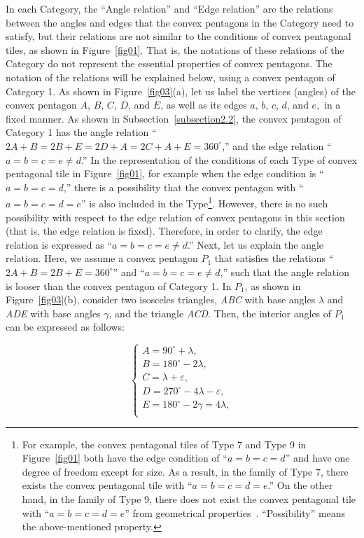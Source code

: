 \documentclass[11pt, a4paper]{article}
\begin{document}
In each Category, the ``Angle relation'' and ``Edge relation'' are the 
relations between the angles and edges that the convex pentagons in the 
Category need to satisfy, but their relations are not similar to the 
conditions of convex pentagonal tiles, as shown in Figure~\ref{fig01}. That is, the 
notations of these relations of the Category do not represent the essential 
properties of convex pentagons. The notation of the relations will be explained 
below, using a convex pentagon of Category 1. As shown in Figure~\ref{fig03}(a), 
let us label the vertices (angles) of the convex pentagon $A$, $B$, $C$, $D$, and 
$E$, as well as its edges $a$, $b$, $c$, $d$, and $e,$ in a fixed manner. As shown in 
Subsection~\ref{subsection2.2}, the convex pentagon of Category 1 has the angle 
relation ``$2A+B = 2B+E = 2D+A = 2C+A+E = 360^ \circ$,'' and the edge 
relation ``$a = b = c = e \ne d$.'' In the representation of the conditions of 
each Type of convex pentagonal tile in Figure~\ref{fig01}, for example 
when the edge condition is ``$a = b = c = d$,'' there is a possibility 
that the convex pentagon with ``$a = b = c = d = e$'' is also 
included in the Type\footnote{ For example, the convex pentagonal tiles 
of Type 7 and Type 9 in Figure~\ref{fig01} both have the edge condition of 
``$a = b = c = d$'' and have one degree of freedom except for size. As a 
result, in the family of Type 7, there exists the convex pentagonal tile 
with ``$a = b = c = d = e$.'' On the other hand, in the family of Type 9, there 
does not exist the convex pentagonal tile with ``$a = b = c = d = e$'' from 
geometrical properties~\cite{Su_and_Og_2009, Wiki_PenTP}. ``Possibility'' 
means the above-mentioned property.}. 
However, there is no such possibility with respect to the edge 
relation of convex pentagons in this section (that is, the edge relation is 
fixed). Therefore, in order to clarify, the edge relation is expressed as 
``$a = b = c = e \ne d$.'' Next, let us explain the angle relation. Here, we 
assume a convex pentagon $P_{1}$ that satisfies the relations 
``$2A+B = 2B+E = 360^ \circ$'' and ``$a = b = c = e \ne d$,'' such that 
the angle relation is looser than the convex pentagon of Category 1. 
In $P_{1}$, as shown in Figure~\ref{fig03}(b), consider two isosceles 
triangles, \textit{ABC} with base angles $\lambda $ and \textit{ADE} 
with base angles $\gamma $, and the triangle \textit{ACD}. Then, 
the interior angles of $P_{1}$ can be expressed as follows:


\begin{equation}
\label{eq1}
\left\{ {\begin{array}{l}
 A = 90^ \circ + \lambda , \\ 
 B = 180^ \circ - 2\lambda , \\ 
 C = \lambda + \varepsilon , \\ 
 D = 270^ \circ - 4\lambda - \varepsilon , \\ 
 E = 180^ \circ - 2\gamma = 4\lambda , \\ 
 \end{array}} \right.
\end{equation}
\end{document}
